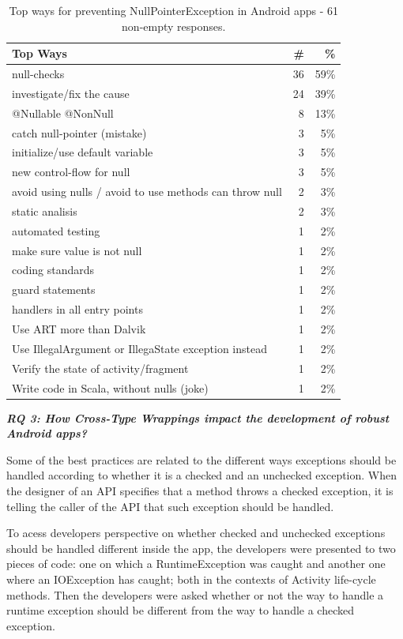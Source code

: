 \begin{table}
\scriptsize
\centering
\begin{tabular}{lrr}
\hline
\bfseries{Top Ways} & \bfseries{\#} & \bfseries{\%} \\
\hline
null-checks &	36 &	59\% \\
investigate/fix the cause	& 24 & 	39\% \\
@Nullable @NonNull &	8 &	13\% \\
catch null-pointer (mistake)	& 3 &	5\% \\
initialize/use default variable	& 3 &	5\% \\
new control-flow for null	& 3 &	5\% \\
avoid using nulls / avoid to use methods can throw null	& 2 &	3\% \\
static analisis	& 2 &	3\% \\
automated testing	& 1 &	2\% \\
make sure value is not null	& 1 &	2\% \\
coding standards	& 1 &	2\% \\
guard statements 	& 1 &	2\% \\
handlers in all entry points	& 1 & 	2\% \\
Use ART more than Dalvik	& 1 &	2\% \\
Use IllegalArgument or IllegaState exception instead	& 1 &	2\% \\
Verify the state of activity/fragment	& 1 &	2\% \\
Write code in Scala, without nulls (joke)	& 1 &	2\% \\
\hline
\end{tabular}
\caption{Top ways for preventing NullPointerException in Android apps - 61 non-empty responses. }
\label{tab:handlingruntime}
\end{table}	


\bigskip 

\noindent\emph{\textbf{RQ 3: How Cross-Type Wrappings impact the development of robust Android apps?}}

\bigskip

Some of the best practices are related to the different ways exceptions should be handled according to whether it is a checked and an unchecked exception. When the designer of an API specifies that a method throws a checked exception, it is telling the caller of the API that such exception should be handled.

To acess developers perspective on whether checked and unchecked exceptions should be handled different inside the app, the developers were presented to two pieces of code: one on which a RuntimeException was caught and another one where an IOException has caught; both in the contexts of Activity life-cycle methods. Then the developers were asked whether or not the way to handle a runtime exception should be different from the way to handle a checked exception. 

